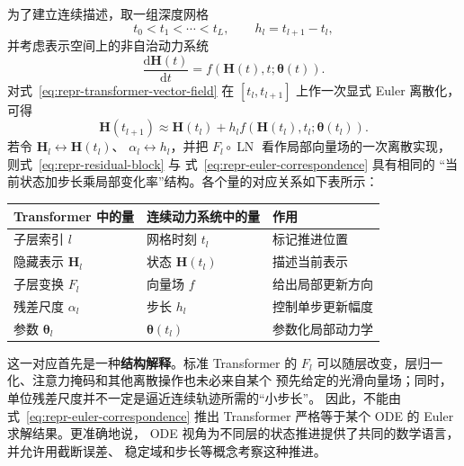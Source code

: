 为了建立连续描述，取一组深度网格
\[
    t_0<t_1<\cdots<t_L,
    \qquad
    h_l=t_{l+1}-t_l,
\]
并考虑表示空间上的非自治动力系统
\begin{equation}
    \frac{\mathrm{d}\boldsymbol{H}(t)}{\mathrm{d}t}
    =
    f\!\left(
        \boldsymbol{H}(t),t;
        \boldsymbol{\theta}(t)
    \right).
    \label{eq:repr-transformer-vector-field}
\end{equation}
对式~\eqref{eq:repr-transformer-vector-field} 在
\([t_l,t_{l+1}]\) 上作一次显式 Euler 离散化，可得
\begin{equation}
    \boldsymbol{H}(t_{l+1})
    \approx
    \boldsymbol{H}(t_l)
    +
    h_l
    f\!\left(
        \boldsymbol{H}(t_l),t_l;
        \boldsymbol{\theta}(t_l)
    \right).
    \label{eq:repr-euler-correspondence}
\end{equation}
若令
\(\boldsymbol{H}_{l}\leftrightarrow\boldsymbol{H}(t_l)\)、
\(\alpha_l\leftrightarrow h_l\)，并把
\(F_l\circ\operatorname{LN}\) 看作局部向量场的一次离散实现，
则式~\eqref{eq:repr-residual-block} 与
式~\eqref{eq:repr-euler-correspondence} 具有相同的
“当前状态加步长乘局部变化率”结构。各个量的对应关系如下表所示：
\begin{center}
\begin{tabular}{lll}
    \toprule
    Transformer 中的量 & 连续动力系统中的量 & 作用 \\
    \midrule
    子层索引 \(l\) & 网格时刻 \(t_l\) & 标记推进位置 \\
    隐藏表示 \(\boldsymbol{H}_l\) & 状态 \(\boldsymbol{H}(t_l)\) & 描述当前表示 \\
    子层变换 \(F_l\) & 向量场 \(f\) & 给出局部更新方向 \\
    残差尺度 \(\alpha_l\) & 步长 \(h_l\) & 控制单步更新幅度 \\
    参数 \(\boldsymbol{\theta}_l\) & \(\boldsymbol{\theta}(t_l)\) & 参数化局部动力学 \\
    \bottomrule
\end{tabular}
\end{center}

这一对应首先是一种\textbf{结构解释}。标准 Transformer 的
\(F_l\) 可以随层改变，层归一化、注意力掩码和其他离散操作也未必来自某个
预先给定的光滑向量场；同时，单位残差尺度并不一定是逼近连续轨迹所需的“小步长”。
因此，不能由式~\eqref{eq:repr-euler-correspondence} 推出
Transformer 严格等于某个 ODE 的 Euler 求解结果。更准确地说，
ODE 视角为不同层的状态推进提供了共同的数学语言，并允许用截断误差、
稳定域和步长等概念考察这种推进。

